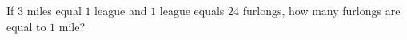 If $3$ miles equal $1$ league and $1$ league equals $24$ furlongs, how many furlongs are equal to $1$ mile?

